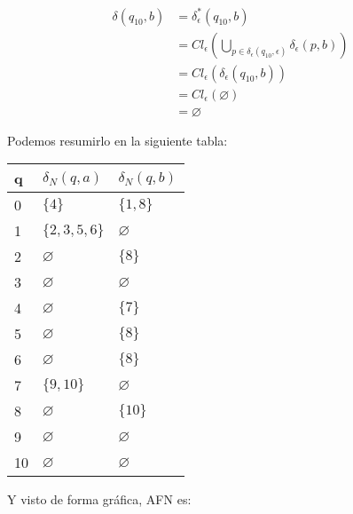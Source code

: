 \documentclass{article}
\begin{document}
\begin{enumerate}
{\begin{enumerate}
{					\begin{align*}
						\delta(q_{10}, b) &= \delta^{*}_{\epsilon}(q_{10}, b) \\
						&= Cl_{\epsilon}(\bigcup_{p \in \delta_{\epsilon}(q_{10}, \epsilon)}
						{\delta_{\epsilon}(p, b)}) \\
						&= Cl_{\epsilon}(\delta_{\epsilon}(q_{10}, b))\\
						&= Cl_{\epsilon}(\varnothing)\\
						&= \varnothing
					\end{align*}
				
				Podemos resumirlo en la siguiente tabla:\\
				
				\begin{table}[H]
					\centering
					\begin{tabular}{|l|l|l|}
						\hline
						q  & $\delta_{N} (q,a)$ & $\delta_{N} (q,b)$ \\ \hline
						0  & $\{4\}$            & $\{1, 8\}$         \\ \hline
						1  & $\{2, 3, 5, 6\}$   & $\varnothing$      \\ \hline
						2  & $\varnothing$      & $\{8\}$            \\ \hline
						3  & $\varnothing$      & $\varnothing$      \\ \hline
						4  & $\varnothing$      & $\{7\}$            \\ \hline
						5  & $\varnothing$      & $\{8\}$            \\ \hline
						6  & $\varnothing$      & $\{8\}$            \\ \hline
						7  & $\{9, 10\}$        & $\varnothing$      \\ \hline
						8  & $\varnothing$      & $\{10\}$           \\ \hline
						9  & $\varnothing$      & $\varnothing$      \\ \hline
						10 & $\varnothing$      & $\varnothing$      \\ \hline
					\end{tabular}
				\end{table}
				
				$  $\\[.3cm]
				
				Y visto de forma gráfica, AFN es:\\
				
}
\end{enumerate}}
\end{enumerate}
\end{document}
